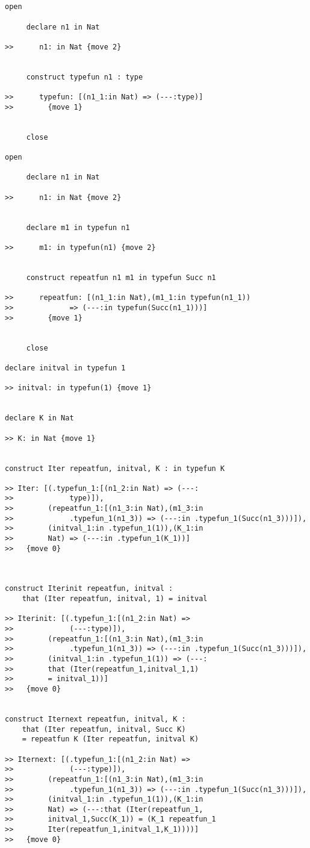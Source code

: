 \documentclass[12pt]{article}
\begin{document}
\begin{verbatim}


open

     declare n1 in Nat

>>      n1: in Nat {move 2}


     construct typefun n1 : type

>>      typefun: [(n1_1:in Nat) => (---:type)]
>>        {move 1}


     close

open

     declare n1 in Nat

>>      n1: in Nat {move 2}


     declare m1 in typefun n1

>>      m1: in typefun(n1) {move 2}


     construct repeatfun n1 m1 in typefun Succ n1

>>      repeatfun: [(n1_1:in Nat),(m1_1:in typefun(n1_1)) 
>>             => (---:in typefun(Succ(n1_1)))]
>>        {move 1}


     close

declare initval in typefun 1

>> initval: in typefun(1) {move 1}


declare K in Nat

>> K: in Nat {move 1}


construct Iter repeatfun, initval, K : in typefun K

>> Iter: [(.typefun_1:[(n1_2:in Nat) => (---:
>>             type)]),
>>        (repeatfun_1:[(n1_3:in Nat),(m1_3:in 
>>             .typefun_1(n1_3)) => (---:in .typefun_1(Succ(n1_3)))]),
>>        (initval_1:in .typefun_1(1)),(K_1:in 
>>        Nat) => (---:in .typefun_1(K_1))]
>>   {move 0}



construct Iterinit repeatfun, initval : 
    that (Iter repeatfun, initval, 1) = initval

>> Iterinit: [(.typefun_1:[(n1_2:in Nat) => 
>>             (---:type)]),
>>        (repeatfun_1:[(n1_3:in Nat),(m1_3:in 
>>             .typefun_1(n1_3)) => (---:in .typefun_1(Succ(n1_3)))]),
>>        (initval_1:in .typefun_1(1)) => (---:
>>        that (Iter(repeatfun_1,initval_1,1) 
>>        = initval_1))]
>>   {move 0}


construct Iternext repeatfun, initval, K : 
    that (Iter repeatfun, initval, Succ K) 
    = repeatfun K (Iter repeatfun, initval K)

>> Iternext: [(.typefun_1:[(n1_2:in Nat) => 
>>             (---:type)]),
>>        (repeatfun_1:[(n1_3:in Nat),(m1_3:in 
>>             .typefun_1(n1_3)) => (---:in .typefun_1(Succ(n1_3)))]),
>>        (initval_1:in .typefun_1(1)),(K_1:in 
>>        Nat) => (---:that (Iter(repeatfun_1,
>>        initval_1,Succ(K_1)) = (K_1 repeatfun_1 
>>        Iter(repeatfun_1,initval_1,K_1))))]
>>   {move 0}

\end{verbatim}
\end{document}
